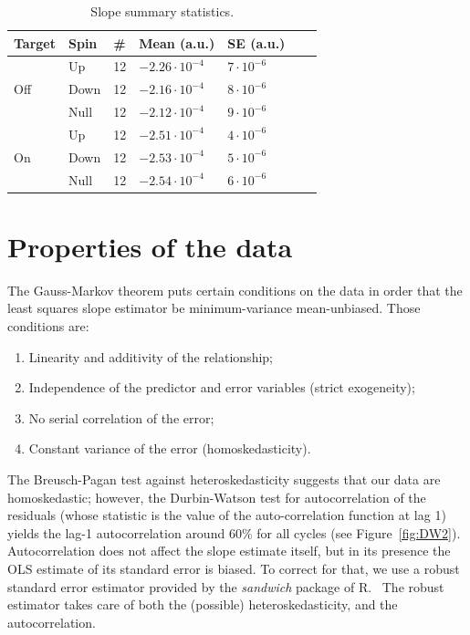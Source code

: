 \documentclass{report}
\begin{document}
\newcommand{\vp}[2]{#1\cdot10^{#2}}
\begin{table}[h]
	\centering
	\caption{Slope summary statistics.\label{tbl:SlpSumStat}}
	\begin{tabular}{lllllrr}
		\hline\hline
		       Target        & Spin & \# & Mean (a.u.)      & SE (a.u.)    \\ \hline
		\multirow{3}{*}{Off} & Up   & 12 & $\vp{-2.26}{-4}$ & $\vp{7}{-6}$ \\
		                     & Down & 12 & $\vp{-2.16}{-4}$ & $\vp{8}{-6}$ \\
		                     & Null & 12 & $\vp{-2.12}{-4}$ & $\vp{9}{-6}$ \\ \hline
		\multirow{3}{*}{On}  & Up   & 12 & $\vp{-2.51}{-4}$ & $\vp{4}{-6}$ \\
		                     & Down & 12 & $\vp{-2.53}{-4}$ & $\vp{5}{-6}$ \\
		                     & Null & 12 & $\vp{-2.54}{-4}$ & $\vp{6}{-6}$ \\ \hline
	\end{tabular}
\end{table}


\section{Properties of the data}
The Gauss-Markov theorem puts certain conditions on the data in order that the least squares slope estimator be minimum-variance mean-unbiased. Those conditions are:~\cite{GaussMarkov}
\begin{enumerate}
	\item Linearity and additivity of the relationship;
	\item Independence of the predictor and error variables (strict exogeneity);
	\item No serial correlation of the error;
	\item Constant variance of the error (homoskedasticity).
\end{enumerate}

The Breusch-Pagan test against heteroskedasticity suggests that our data are homoskedastic; however, the Durbin-Watson test for autocorrelation of the residuals (whose statistic is the value of the auto-correlation function at lag 1) yields the lag-1 autocorrelation around 60\% for all cycles (see Figure~\ref{fig:DW2}). Autocorrelation does not affect the slope estimate itself, but in its presence the OLS estimate of its standard error is biased. To correct for that, we use a robust standard error estimator provided by the \emph{sandwich} package of R.~\cite{RSandwich} The robust estimator takes care of both the (possible) heteroskedasticity, and the autocorrelation. 
\end{document}
